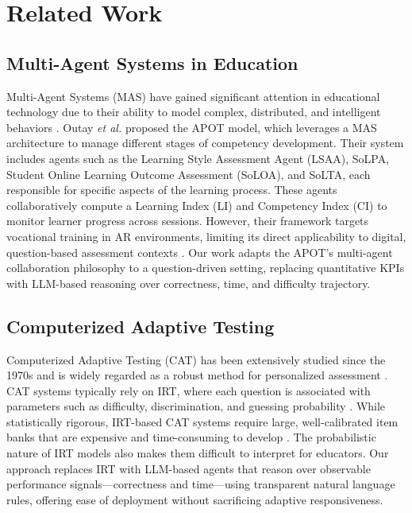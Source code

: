 \documentclass[conference]{IEEEtran}
\begin{document}
\section{Related Work}

\subsection{Multi-Agent Systems in Education}
Multi-Agent Systems (MAS) have gained significant attention in educational technology due to their ability to model complex, distributed, and intelligent behaviors \cite{wooldridge2009}. Outay \textit{et al.} \cite{outay2024} proposed the APOT model, which leverages a MAS architecture to manage different stages of competency development. Their system includes agents such as the Learning Style Assessment Agent (LSAA), SoLPA, Student Online Learning Outcome Assessment (SoLOA), and SoLTA, each responsible for specific aspects of the learning process. These agents collaboratively compute a Learning Index (LI) and Competency Index (CI) to monitor learner progress across sessions. However, their framework targets vocational training in AR environments, limiting its direct applicability to digital, question-based assessment contexts \cite{outay2024}. Our work adapts the APOT's multi-agent collaboration philosophy to a question-driven setting, replacing quantitative KPIs with LLM-based reasoning over correctness, time, and difficulty trajectory.

\subsection{Computerized Adaptive Testing}
Computerized Adaptive Testing (CAT) has been extensively studied since the 1970s and is widely regarded as a robust method for personalized assessment \cite{weiss2004}. CAT systems typically rely on IRT, where each question is associated with parameters such as difficulty, discrimination, and guessing probability \cite{lord1980}. While statistically rigorous, IRT-based CAT systems require large, well-calibrated item banks that are expensive and time-consuming to develop \cite{hambleton1985}. The probabilistic nature of IRT models also makes them difficult to interpret for educators. Our approach replaces IRT with LLM-based agents that reason over observable performance signals---correctness and time---using transparent natural language rules, offering ease of deployment without sacrificing adaptive responsiveness.
\end{document}
